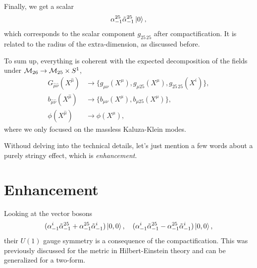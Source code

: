 Finally, we get a scalar
\begin{equation}\label{eq:comp-scalar}
    \alpha^{25}_{-1} \tilde{\alpha}^{25}_{-1} \ket{0},
\end{equation}
which corresponds to the scalar component $g_{25 \, 25}$ after compactification. It is related to the radius of the extra-dimension, as discussed before.

To sum up, everything is coherent with the expected decomposition of the fields under $\mathcal{M}_{26} \to \mathcal{M}_{25} \times S^1$,
\begin{equation}
\begin{aligned}
    G_{\hat{\mu}\hat{\nu}} (X^{\hat{\mu}}) &\to \{ g_{\mu\nu}(X^\mu), g_{\mu 25} (X^\mu), g_{25 \, 25}(X^i) \},\\
    b_{\hat{\mu}\hat{\nu}} (X^{\hat{\mu}}) &\to \{ b_{\mu\nu}(X^\mu), b_{\mu 25}(X^\mu) \},\\
    \phi (X^{\hat{\mu}}) &\to \phi(X^\mu),
\end{aligned}
\end{equation}
where we only focused on the massless Kaluza-Klein modes.

Withoud delving into the technical details, let's just mention a few words about a purely stringy effect, which is \emph{enhancement}.

\section{Enhancement}
Looking at the vector bosons
\begin{equation}
    (\alpha^{i}_{-1} \tilde{\alpha}^{25}_{-1}+ \alpha^{25}_{-1} \tilde{\alpha}^{i}_{-1}) \ket{0,0}, \quad (\alpha^{i}_{-1} \tilde{\alpha}^{25}_{-1} - \alpha^{25}_{-1} \tilde{\alpha}^{i}_{-1}) \ket{0,0},
\end{equation}
their $U(1)$ gauge symmetry is a consequence of the compactification. This was previously discussed for the metric in Hilbert-Einstein theory and can be generalized for a two-form. 

